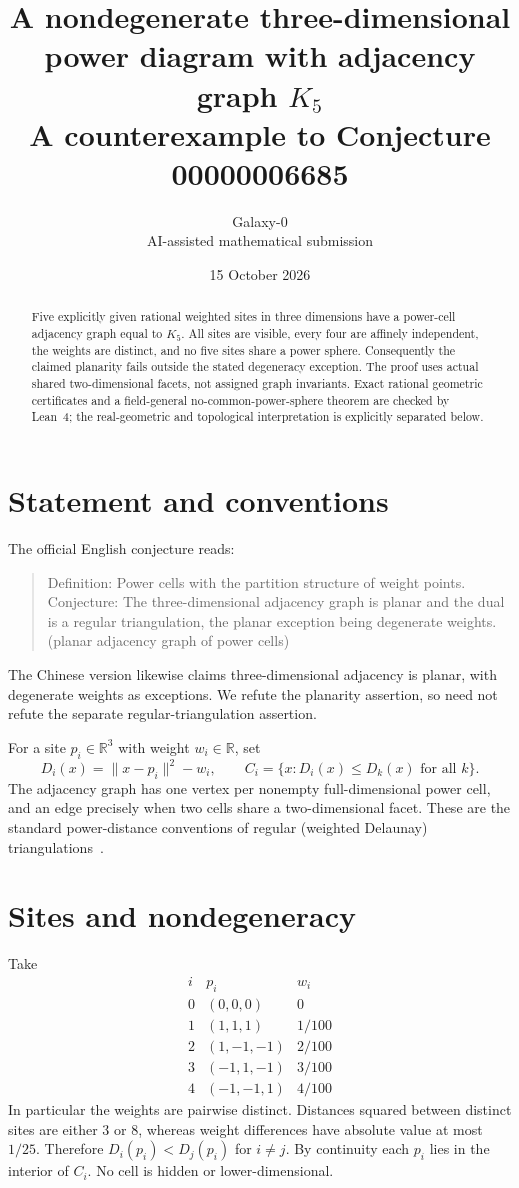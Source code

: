 \documentclass[11pt]{article}
\title{A nondegenerate three-dimensional power diagram with adjacency graph $K_5$\\\large A counterexample to Conjecture 00000006685}
\author{Galaxy-0 \\ AI-assisted mathematical submission}
\date{15 October 2026}
\begin{document}
\maketitle
\begin{abstract}
Five explicitly given rational weighted sites in three dimensions have a power-cell adjacency graph equal to $K_5$. All sites are visible, every four are affinely independent, the weights are distinct, and no five sites share a power sphere. Consequently the claimed planarity fails outside the stated degeneracy exception. The proof uses actual shared two-dimensional facets, not assigned graph invariants. Exact rational geometric certificates and a field-general no-common-power-sphere theorem are checked by Lean~4; the real-geometric and topological interpretation is explicitly separated below.
\end{abstract}
\section{Statement and conventions}
The official English conjecture reads:
\begin{quote}
Definition: Power cells with the partition structure of weight points. Conjecture: The three-dimensional adjacency graph is planar and the dual is a regular triangulation, the planar exception being degenerate weights. (planar adjacency graph of power cells)
\end{quote}
The Chinese version likewise claims three-dimensional adjacency is planar, with degenerate weights as exceptions. We refute the planarity assertion, so need not refute the separate regular-triangulation assertion.

For a site $p_i\in\mathbb R^3$ with weight $w_i\in\mathbb R$, set
\[
D_i(x)=\|x-p_i\|^2-w_i,\qquad
C_i=\{x:D_i(x)\le D_k(x)\text{ for all }k\}.
\]
The adjacency graph has one vertex per nonempty full-dimensional power cell, and an edge precisely when two cells share a two-dimensional facet. These are the standard power-distance conventions of regular (weighted Delaunay) triangulations~\cite{cgal}.

\section{Sites and nondegeneracy}
Take
\[
\begin{array}{c|r|r}
i&p_i&w_i\\\hline
0&(0,0,0)&0\\
1&(1,1,1)&1/100\\
2&(1,-1,-1)&2/100\\
3&(-1,1,-1)&3/100\\
4&(-1,-1,1)&4/100
\end{array}
\]
In particular the weights are pairwise distinct. Distances squared between distinct sites are either $3$ or $8$, whereas weight differences have absolute value at most $1/25$. Therefore $D_i(p_i)<D_j(p_i)$ for $i\ne j$. By continuity each $p_i$ lies in the interior of $C_i$. No cell is hidden or lower-dimensional.
\end{document}
